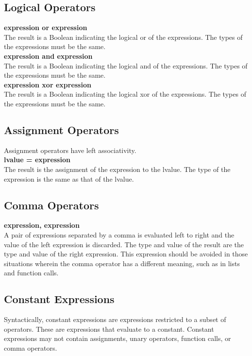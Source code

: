 \documentclass[12pt]{report}
\begin{document}
    \subsection*{Logical Operators}
    
    \textbf{expression or expression}\\
    The result is a Boolean indicating the logical or of the expressions. The types of the expressions must be the same. \\ 
    \textbf{expression and expression}\\
    The result is a Boolean indicating the logical and of the expressions. The types of the expressions must be the same. \\ 
	\textbf{expression xor expression}\\
    The result is a Boolean indicating the logical xor of the expressions. The types of the expressions must be the same. 

    
    \subsection*{Assignment Operators}
    
     Assignment operators have left associativity. \\ 
	\textbf{lvalue = expression}\\
    The result is the assignment of the expression to the lvalue. The type of the expression is the same as that of the lvalue. 
    
    \subsection*{Comma Operators}
    
    \textbf{expression, expression}\\
    A pair of expressions separated by a comma is evaluated left to right and the value of the left expression is discarded. The type and value of the result are the type and value of the right expression. This expression should be avoided in those situations wherein the comma operator has a different meaning, such as in lists and function calls.\\ 
    
    \subsection*{Constant Expressions}
     Syntactically, constant expressions are expressions restricted to a subset of operators. These are expressions that evaluate to a constant. Constant expressions may not contain assignments, unary operators, function calls, or comma operators.
        
\end{document}
